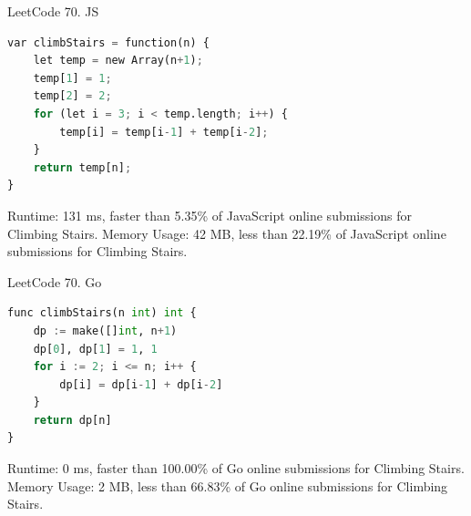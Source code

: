 \documentclass[10pt,UTF8]{ctexart}
\begin{document}
LeetCode 70. JS

\begin{lstlisting}[language={python}]
var climbStairs = function(n) {
    let temp = new Array(n+1);
    temp[1] = 1;
    temp[2] = 2;
    for (let i = 3; i < temp.length; i++) {
        temp[i] = temp[i-1] + temp[i-2];
    }
    return temp[n];
}
\end{lstlisting}

Runtime: 131 ms, faster than 5.35\% of JavaScript online submissions for Climbing Stairs.
Memory Usage: 42 MB, less than 22.19\% of JavaScript online submissions for Climbing Stairs.

LeetCode 70. Go

\begin{lstlisting}[language={python}]
func climbStairs(n int) int {
    dp := make([]int, n+1)
    dp[0], dp[1] = 1, 1
    for i := 2; i <= n; i++ {
        dp[i] = dp[i-1] + dp[i-2]
    }
    return dp[n]
}
\end{lstlisting}

Runtime: 0 ms, faster than 100.00\% of Go online submissions for Climbing Stairs.
Memory Usage: 2 MB, less than 66.83\% of Go online submissions for Climbing Stairs.








\clearpage
\end{document}
